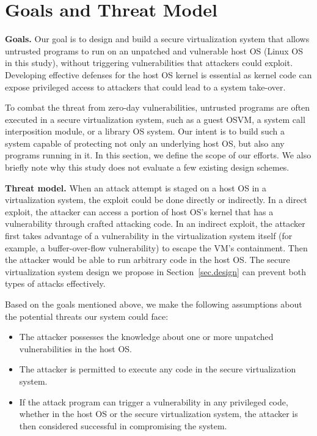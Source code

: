\section{Goals and Threat Model}
\label{sec.motivation-and-background}

\textbf{Goals.}
Our goal is to design and build a secure virtualization system that allows
untrusted programs to run on an unpatched and vulnerable host OS (Linux OS in
this study), without triggering vulnerabilities that attackers could exploit.
Developing effective defenses for the host OS kernel is essential as kernel code
can expose privileged access to attackers that could lead to a system take-over.

To combat the threat from zero-day vulnerabilities, untrusted programs are often executed in a 
secure virtualization system, such as a guest OSVM, a system call 
interposition module, or a library OS system. Our intent is to
build such a system capable of protecting not only
an underlying host OS, but also any programs running in it. 
In this section, we define the scope of our efforts. We also briefly note why 
this study does not evaluate a few existing design schemes.

\noindent
\textbf{Threat model.}
When an attack attempt is staged
on a host OS in a virtualization system,
the exploit could be done directly or indirectly.
In a direct exploit, the attacker can access a portion of host OS's kernel
that has a vulnerability through crafted attacking code. In an indirect exploit,
the attacker first takes advantage of a vulnerability in the virtualization system itself 
(for example, a buffer-over-flow vulnerability) 
to escape the VM's containment. Then the attacker would be able to run arbitrary code 
in the host OS. 
The secure virtualization system design we propose
in Section~\ref{sec.design} can prevent both types of attacks effectively.

Based on the goals mentioned above, we make the following assumptions about the
potential threats our system could face:

\begin{itemize}\setlength\itemsep{0em}

\item The attacker possesses the knowledge about one or more unpatched 
vulnerabilities in the host OS.

\item The attacker is permitted to execute any code in the secure 
virtualization system.

\item If the attack program can trigger a vulnerability in any privileged 
code, whether in the host OS or the secure virtualization system, the attacker 
is then considered successful in compromising the system.

\end{itemize}

